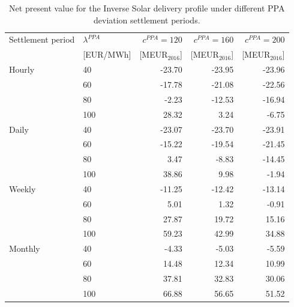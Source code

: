 \begin{table}[H]
\centering
\small
\caption{Net present value for the Inverse Solar delivery profile under different PPA deviation settlement periods.}
\label{tab:npv_inverse_solar}
\begin{tabular}{llrrr}
\toprule
Settlement period & $\lambda^{PPA}$ & $c^{PPA}=120$ & $c^{PPA}=160$ & $c^{PPA}=200$ \\
 & [EUR/MWh] & [MEUR$_{2016}$] & [MEUR$_{2016}$] & [MEUR$_{2016}$] \\
\midrule
Hourly & 40 & -23.70 & -23.95 & -23.96 \\
 & 60 & -17.78 & -21.08 & -22.56 \\
 & 80 & -2.23 & -12.53 & -16.94 \\
 & 100 & 28.32 & 3.24 & -6.75 \\
\addlinespace
Daily & 40 & -23.07 & -23.70 & -23.91 \\
 & 60 & -15.22 & -19.54 & -21.45 \\
 & 80 & 3.47 & -8.83 & -14.45 \\
 & 100 & 38.86 & 9.98 & -1.94 \\
\addlinespace
Weekly & 40 & -11.25 & -12.42 & -13.14 \\
 & 60 & 5.01 & 1.32 & -0.91 \\
 & 80 & 27.87 & 19.72 & 15.16 \\
 & 100 & 59.23 & 42.99 & 34.88 \\
\addlinespace
Monthly & 40 & -4.33 & -5.03 & -5.59 \\
 & 60 & 14.48 & 12.34 & 10.99 \\
 & 80 & 37.81 & 32.83 & 30.06 \\
 & 100 & 66.88 & 56.65 & 51.52 \\
\bottomrule
\end{tabular}
\end{table}

